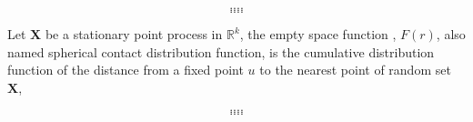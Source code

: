 $$....$$
$$....$$
$$....$$

Let $\bm{X}$ be a stationary point process in $\mathbb{R}^k$, the
empty space function \cite{baddeley2007spatial}, $F(r)$, also named
spherical contact distribution function, is the cumulative
distribution function of the distance from a fixed point $u$ to the
nearest point of random set $\bm{X}$,



$$....$$
$$....$$
$$....$$







